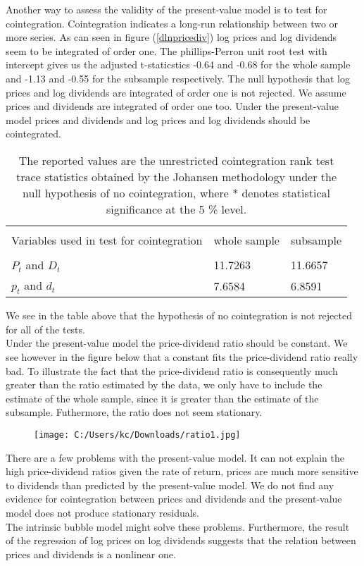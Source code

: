 \documentclass{article}
\begin{document}
Another way to assess the validity of the present-value model is to test for cointegration. Cointegration indicates a long-run relationship between two or more series. As can seen in figure (\ref{dlnpricediv}) log prices and log dividends seem to be integrated of order one. The phillips-Perron unit root test with intercept gives us the adjusted t-staticstics -0.64 and  -0.68 for the whole sample and -1.13 and -0.55 for the subsample respectively. The null hypothesis that log prices and log dividends are integrated of order one is not rejected. We assume prices and dividends are integrated of order one too. Under the present-value model prices and dividends and log prices and log dividends should be cointegrated.

\begin{table}[h!]
\centering
\begin{tabular}{l | l l }
\hline \\
Variables used in test for cointegration & whole sample & subsample \\
\hline \\
$P_t$ and $D_t$ & 11.7263 & 11.6657 \\ 
$p_t$ and $d_t$ & 7.6584 & 6.8591  \\
\hline 
\end{tabular}
\caption{The reported values are the unrestricted cointegration rank test trace statistics obtained by the Johansen methodology under the null hypothesis of no cointegration, where * denotes statistical significance at the 5 \% level.}
We see in the table above that the hypothesis of no cointegration is not rejected for all of the tests. \\
Under the present-value model the price-dividend ratio should be constant. We see however in the figure below that a constant fits the price-dividend ratio really bad. To illustrate the fact that the price-dividend ratio is consequently much greater than the ratio estimated by the data, we only have to include the estimate of the whole sample, since it is greater than the estimate of the subsample. Futhermore, the ratio does not seem stationary. 
\end{table}

\begin{figure}[h!]
\centering
		\texttt{[image: C:/Users/kc/Downloads/ratio1.jpg]}
	\label{ratio}
\end{figure}



There are a few problems with the present-value model. It can not explain the high price-dividend ratios given the rate of return, prices are much more sensitive to dividends than predicted by the present-value model. We do not find any evidence for cointegration between prices and dividends and the present-value model does not produce stationary residuals.  \\
The intrinsic bubble model might solve these problems. Furthermore, the result of the  regression of log prices on log dividends suggests that the relation between prices and dividends is a nonlinear one.  
\end{document}
